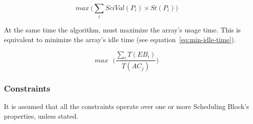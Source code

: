 \begin{equation}
\label{eq:max-sci-value}
max \: \bigg(\sum_{i} SciVal(P_i) \times St(P_i)\bigg)
\end{equation}

At the same time the algorithm, must maximize the array's usage time. This is equivalent to minimize the array's idle time (see equation~\ref{eq:min-idle-time}).

\begin{equation}
\label{eq:min-idle-time}
max \mbox{ }\Bigg( \frac{\sum_{i}T(EB_i)}{T(AC_j)}\Bigg)
\end{equation}


\subsubsection{Constraints}
\label{sec:sched-constraints}
It is assumed that all the constraints operate over one or more Scheduling Block's properties, unless stated.

